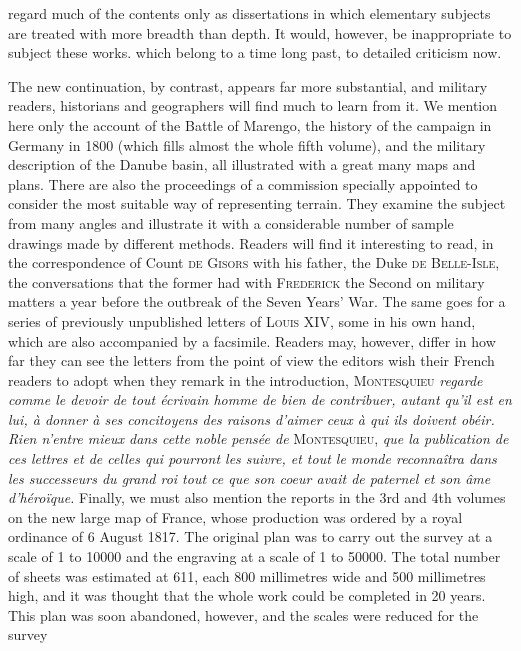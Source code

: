 %
regard much of the contents only as dissertations in which elementary subjects are treated with more breadth than depth. It would, however, be inappropriate to subject these works. which belong to a time long past, to detailed criticism now.

The new continuation, by contrast, appears far more substantial, and military readers, historians and geographers will find much to learn from it. We mention here only the account of the Battle of Marengo, the history of the campaign in Germany in 1800 (which fills almost the whole fifth volume), and the military description of the Danube basin, all illustrated with a great many maps and plans. There are also the proceedings of a commission specially appointed to consider the most suitable way of representing terrain. They examine the subject from many angles and illustrate it with a considerable number of sample drawings made by different methods. Readers will find it interesting to read, in the correspondence of Count \textsc{de Gisors} with his father, the Duke \textsc{de Belle-Isle}, the conversations that the former had with \textsc{Frederick} the Second on military matters a year before the outbreak of the Seven Years' War. The same goes for a series of previously unpublished letters of \textsc{Louis} XIV, some in his own hand, which are also accompanied by a facsimile. Readers may, however, differ in how far they can see the letters from the point of view the editors wish their French readers to adopt when they remark in the introduction, \textsc{Montesquieu} \textit{regarde comme le devoir de tout écrivain homme de bien de contribuer, autant qu’il est en lui, à donner à ses concitoyens des raisons d’aimer ceux à qui ils doivent obéir. Rien n’entre mieux dans cette noble pensée de} \textsc{Montesquieu}, \textit{que la publication de ces lettres et de celles qui pourront les suivre, et tout le monde reconnaîtra dans les successeurs du grand roi tout ce que son coeur avait de paternel et son âme d’héroïque.} Finally, we must also mention the reports in the 3rd and 4th volumes on the new large map of France, whose production was ordered by a royal ordinance of 6 August 1817. The original plan was to carry out the survey at a scale of 1 to 10000 and the engraving at a scale of 1 to 50000. The total number of sheets was estimated at 611, each 800 millimetres wide and 500 millimetres high, and it was thought that the whole work could be completed in 20 years. This plan was soon abandoned, however, and the scales were reduced for the survey
